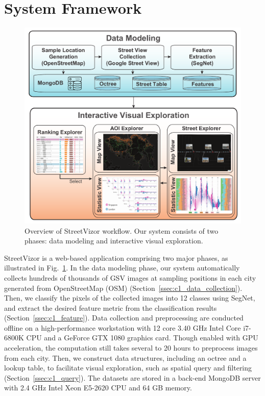 \section{System Framework}



\begin{figure}[t]
	\centering
	\includegraphics[width=0.9\columnwidth]{figure/streetvizor/fig2_framework/framework}
	\vspace{-5mm}
	\caption{Overview of StreetVizor workflow. Our system consists of two phases: data modeling and interactive visual exploration.}
	\label{fig:c1_sys_overview}
	\vspace{-1mm}
\end{figure}

StreetVizor is a web-based application comprising two major phases, as illustrated in Fig.~\ref{fig:c1_sys_overview}.
In the data modeling phase, our system automatically collects hundreds of thousands of GSV images at sampling positions in each city generated from OpenStreetMap (OSM) (Section~\ref{ssec:c1_data_collection}).
Then, we classify the pixels of the collected images into 12 classes using SegNet, and extract the desired feature metric from the classification results (Section~\ref{ssec:c1_feature}).
Data collection and preprocessing are conducted offline on a high-performance workstation with 12 core 3.40 GHz Intel Core i7-6800K CPU and a GeForce GTX 1080 graphics card.
Though enabled with GPU acceleration, the computation still takes several to 20 hours to preprocess images from each city.
Then, we construct data structures, including an octree and a lookup table, to facilitate visual exploration, such as spatial query and filtering (Section~\ref{ssec:c1_query}).
The datasets are stored in a back-end MongoDB server with 2.4 GHz Intel Xeon E5-2620 CPU and 64 GB memory.

